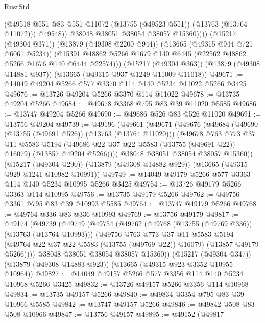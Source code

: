 \begin{lexlean}{RustStd}
\begin{coremodule}
                  (@49518 @551 @83 @551 @11072 (@13755 (@49523 @551)) (@13763 (@13764 @11072)))
                  @49548))
              @38048
              @38051
              @38054
              @38057
              @15360))))
      (@15217 (@49304 @371))
      (@13879 (@49308 @2200 @944))
      (@13665 (@49315 @944 @721 @6061 @5234))
      (@15391 @48862 @5266 @1679 @140 @6445 (@22562 @48862 @5266 @1676 @140 @6444 @22574)))
    (@15217 (@49304 @363))
    (@13879 (@49308 @14881 @937))
    (@13665 (@49315 @937 @1249 @11009 @11018))
@49671 := @14049 @49204 @5266 @577 @3370 @114 @140 @5234 @11022 @5266 @3425
@49676 := @13726 @49204 @5266 @3370 @114 @11022
@49678 := @13735 @49204 @5266
@49684 := @49678 @3368 @795 @83 @39 @11020 @5585
@49686 := @13747 @49204 @5266
@49690 := @49686 @526 @83 @526 @11020
@49691 := @13756 @49204
@49739 := @49196
    (@49661
      (@49671
        (@49676
          (@49684
            (@49690 (@13755 (@49691 @526)) (@13763 (@13764 @11020)))
            (@49678
              @763
              @773
              @37
              @11
              @5583
              @5194
              (@49686 @22 @37 @22 @5583 (@13755 (@49691 @22)) @16079)
              (@13857 @49204 @5266))))
        @38048
        @38051
        @38054
        @38057
        @15360))
    (@15217 (@49304 @290))
    (@13879 (@49308 @14882 @929))
    (@13665 (@49315 @929 @1241 @10982 @10991))
@49749 := @14049 @49179 @5266 @577 @3363 @114 @140 @5234 @10995 @5266 @3425
@49754 := @13726 @49179 @5266 @3363 @114 @10995
@49756 := @13735 @49179 @5266
@49762 := @49756 @3361 @795 @83 @39 @10993 @5585
@49764 := @13747 @49179 @5266
@49768 := @49764 @336 @83 @336 @10993
@49769 := @13756 @49179
@49817 := @49174
    (@49739
      (@49749
        (@49754
          (@49762
            (@49768 (@13755 (@49769 @336)) (@13763 (@13764 @10993)))
            (@49756
              @763
              @773
              @37
              @11
              @5583
              @5194
              (@49764 @22 @37 @22 @5583 (@13755 (@49769 @22)) @16079)
              (@13857 @49179 @5266))))
        @38048
        @38051
        @38054
        @38057
        @15360))
    (@15217 (@49304 @347))
    (@13879 (@49308 @14883 @923))
    (@13665 (@49315 @923 @3352 @10955 @10964))
@49827 := @14049 @49157 @5266 @577 @3356 @114 @140 @5234 @10968 @5266 @3425
@49832 := @13726 @49157 @5266 @3356 @114 @10968
@49834 := @13735 @49157 @5266
@49840 := @49834 @3354 @795 @83 @39 @10966 @5585
@49842 := @13747 @49157 @5266
@49846 := @49842 @508 @83 @508 @10966
@49847 := @13756 @49157
@49895 := @49152
    (@49817

\end{coremodule}
\end{lexlean}
